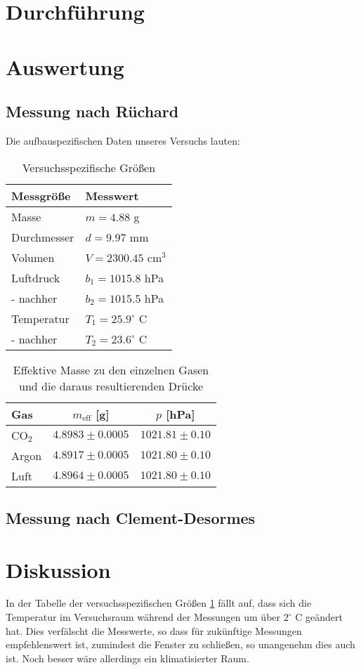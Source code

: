 \documentclass[12pt,a4paper,titlepage,headinclude,bibtotoc]{scrartcl}
\begin{document}
\section{Durchführung}
\label{sec:durchfuehrung}

\section{Auswertung}
\label{sec:auswertung}
\subsection{Messung nach Rüchard}
Die aufbauspezifischen Daten unseres Versuchs lauten:
\begin{table}[!h]
	\centering
	\begin{tabular}{|l|l|}
		\hline
		Messgröße	& Messwert\\\hline\hline
		Masse		& $m=4.88$ g\\\hline
		Durchmesser	& $d=9.97$ mm\\\hline
		Volumen		& $V=2300.45$ cm$^3$\\\hline
		Luftdruck	& $b_1=1015.8$ hPa\\
		- nachher	& $b_2=1015.5$ hPa\\\hline
		Temperatur	& $T_1=25.9^\circ$ C\\
		- nachher	& $T_2=23.6^\circ$ C\\\hline
	\end{tabular}
	\caption{Versuchsspezifische Größen}\label{tab:versgr}
\end{table}

\begin{table}[!htbp]
	\centering
	\begin{tabular}{|l|c|c|}
		\hline
		Gas	& $m_\text{eff}$ [g]		& $p$ [hPa]\\\hline\hline
		CO$_2$	& $4.8983 \pm 0.0005$ 	& $1021.81 \pm 0.10$ \\\hline
		Argon	& $4.8917 \pm 0.0005$ 	& $1021.80 \pm 0.10$ \\\hline
		Luft	& $4.8964 \pm 0.0005$ 	& $1021.80 \pm 0.10$ \\\hline
	\end{tabular}
	\caption{Effektive Masse zu den einzelnen Gasen und die daraus resultierenden Drücke} \label{tab:position}
\end{table}

\subsection{Messung nach Clement-Desormes}


\section{Diskussion}
\label{sec:diskussion}
In der Tabelle der versuchsspezifischen Größen \ref{tab:versgr} fällt auf, dass sich die Temperatur im Versuchsraum während der Messungen um über $2^\circ$ C geändert hat.
Dies verfälscht die Messwerte, so dass für zukünftige Messungen empfehlenswert ist, zumindest die Fenster zu schließen, so unangenehm dies auch ist.
Noch besser wäre allerdings ein klimatisierter Raum.




\end{document}

